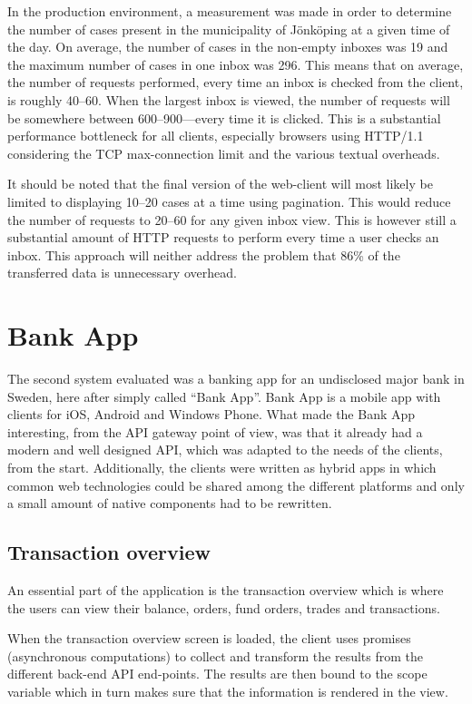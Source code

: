 \documentclass{cslthse-msc}
\begin{document}
In the production environment, a measurement was made in order to determine the number of cases present in the municipality of Jönköping at a given time of the day. On average, the number of cases in the non-empty inboxes was 19 and the maximum number of cases in one inbox was 296. This means that on average, the number of requests performed, every time an inbox is checked from the client, is roughly 40--60. When the largest inbox is viewed, the number of requests will be somewhere between 600--900---every time it is clicked. This is a substantial performance bottleneck for all clients, especially browsers using HTTP/1.1 considering the TCP max-connection limit and the various textual overheads.

It should be noted that the final version of the web-client will most likely be limited to displaying 10--20 cases at a time using pagination. This would reduce the number of requests to 20--60 for any given inbox view. This is however still a substantial amount of HTTP requests to perform every time a user checks an inbox. This approach will neither address the problem that 86\% of the transferred data is unnecessary overhead.

\section{Bank App}
The second system evaluated was a banking app for an undisclosed major bank in Sweden, here after simply called \enquote{Bank App}. Bank App is a mobile app with clients for iOS, Android and Windows Phone. What made the Bank App interesting, from the API gateway point of view, was that it already had a modern and well designed API, which was adapted to the needs of the clients, from the start. Additionally, the clients were written as hybrid apps in which common web technologies could be shared among the different platforms and only a small amount of native components had to be rewritten.

\subsection{Transaction overview}
An essential part of the application is the transaction overview which is where the users can view their balance, orders, fund orders, trades and transactions.

When the transaction overview screen is loaded, the client uses promises (asynchronous computations) to collect and transform the results from the different back-end API end-points. The results are then bound to the scope variable which in turn makes sure that the information is rendered in the view.
\end{document}
